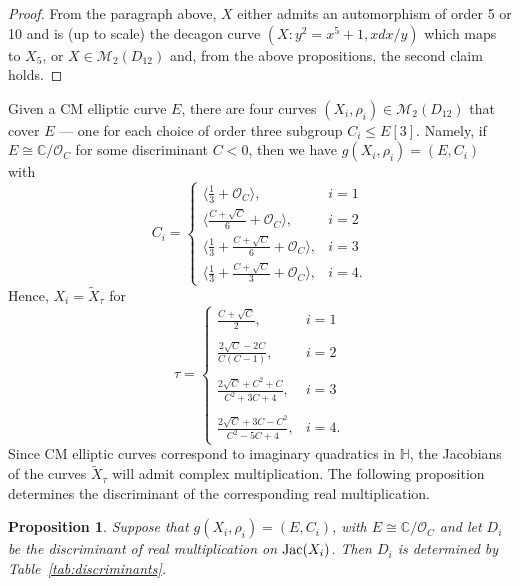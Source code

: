 \documentclass[a4paper,11pt]{amsart}
\numberwithin{equation}{section}
\numberwithin{figure}{section}
\numberwithin{table}{section}
\newtheorem{proposition}[theorem]{Proposition}
\newcommand{\C}{\mathbb{C}}
\DeclareMathOperator{\Jac}{{\rm{Jac}}}
\begin{document}
\begin{proof}
    From the paragraph above, $X$ either admits an automorphism of order 5 or 10 and is (up to scale) the decagon curve $(X:y^2=x^5+1,xdx/y)$ which maps to $X_{5}$, or $X\in\mathcal{M}_{2}(D_{12})$ and, from the above propositions, the second claim holds.
\end{proof}

Given a CM elliptic curve $E$, there are four curves $(X_i,\rho_i)\in\mathcal{M}_{2}(D_{12})$ that cover $E$ --- one for each choice of order three subgroup $C_{i}\leq E[3]$. Namely, if $E\cong\C/\mathcal{O}_{C}$ for some discriminant $C<0$, then we have $g(X_i,\rho_i) = (E,C_i)$ with 
\[C_i = \left\lbrace\begin{array}{cl}
    \langle\frac{1}{3}+\mathcal{O}_{C}\rangle, & i = 1 \\
    \langle\frac{C+\sqrt{C}}{6}+\mathcal{O}_{C}\rangle, & i = 2 \\
    \langle\frac{1}{3}+\frac{C+\sqrt{C}}{6}+\mathcal{O}_{C}\rangle, & i = 3 \\
    \langle\frac{1}{3}+\frac{C+\sqrt{C}}{3}+\mathcal{O}_{C}\rangle, & i = 4.
\end{array}\right.\]
Hence, $X_{i} = \widetilde{X}_{\tau}$ for 
\[\tau = \left\lbrace\begin{array}{cl}
    \frac{C+\sqrt{C}}{2}, & i = 1 \\
    \\
    \frac{2\sqrt{C}-2C}{C(C-1)}, & i = 2 \\
    \\
    \frac{2\sqrt{C}+C^2+C}{C^2+3C+4}, & i = 3 \\
    \\
    \frac{2\sqrt{C}+3C-C^2}{C^2-5C+4}, & i = 4.
\end{array}\right.\]
Since CM elliptic curves correspond to imaginary quadratics in $\mathbb{H}$, the Jacobians of the curves $\widetilde{X}_{\tau}$ will admit complex multiplication. The following proposition determines the discriminant of the corresponding real multiplication.

\begin{proposition}
    Suppose that $g(X_{i},\rho_i) = (E,C_{i})$, with $E\cong\C/\mathcal{O}_{C}$ and let $D_{i}$ be the discriminant of real multiplication on $\Jac(X_{i})$. Then $D_{i}$ is determined by Table~\ref{tab:discriminants}.
\end{proposition}
\end{document}
